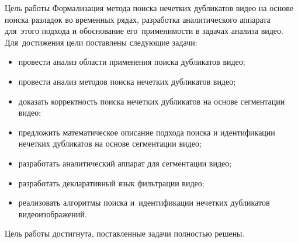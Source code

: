 \documentclass{.local/lib/classes/ndvr-super-article-standalone}
\begin{document}
    \begin{description-item}{Цель работы}
        Формализация метода поиска нечетких 
        дубликатов видео на основе
        поиска разладок во временных рядах,
        разработка аналитического аппарата 
        для~этого подхода и обоснование 
        его~применимости в задачах анализа видео.
        Для~достижения цели поставлены следующие задачи:
        \begin{itemize}
            \item 
                провести анализ области применения поиска 
                дубликатов видео;
            \item 
                провести анализ методов поиска 
                нечетких дубликатов видео;
            \item 
                доказать корректность  
                поиска нечетких дубликатов 
                на основе сегментации видео; 
            \item 
                предложить математическое описание подхода 
                поиска и идентификации нечетких дубликатов 
                на основе сегментации видео;
            \item 
                разработать аналитический аппарат 
                для сегментации видео;
            \item 
                разработать декларативный язык 
                фильтрации видео;
            \item 
                реализовать алгоритмы поиска 
                и~идентификации нечетких дубликатов 
                видеоизображений.
        \end{itemize}
        Цель работы достигнута, 
        поставленные задачи полностью решены.
    \end{description-item}
\end{document}

